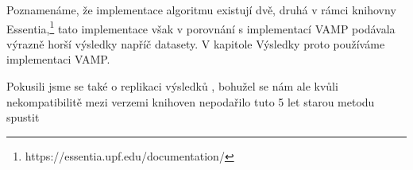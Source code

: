 Poznamenáme, že implementace algoritmu \cite{Salamon2012a} existují dvě, druhá v rámci knihovny Essentia,\footnote{https://essentia.upf.edu/documentation/} tato implementace však v porovnání s implementací VAMP podávala výrazně horší výsledky napříč datasety. V kapitole Výsledky proto používáme implementaci VAMP.

Pokusili jsme se také o replikaci výsledků \cite{Bosch2014}, bohužel se nám ale kvůli nekompatibilitě mezi verzemi knihoven nepodařilo tuto 5 let starou metodu spustit


